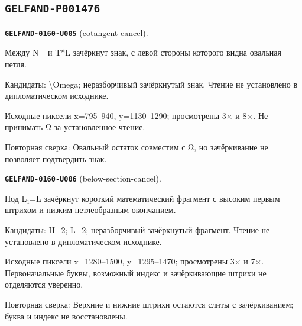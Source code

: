 \subsection*{\texttt{GELFAND-P001476}}
\par\noindent\leavevmode{}\label{GELFAND-0160-U005}\label{GELFAND-P001476:cotangent-cancel}\textbf{\texttt{GELFAND-0160-U005}} (cotangent-cancel).\nopagebreak[4]\par
Между N= и T*L зачёркнут знак, с левой стороны которого видна овальная петля.\par
Кандидаты: \textbackslash{}Omega; неразборчивый зачёркнутый знак. Чтение не установлено в дипломатическом исходнике.\par
Исходные пиксели x=795–940, y=1130–1290; просмотрены 3× и 8×. Не принимать Ω за установленное чтение.\par
Повторная сверка: Овальный остаток совместим с Ω, но зачёркивание не позволяет подтвердить знак.\par\medskip
\par\noindent\leavevmode{}\label{GELFAND-0160-U006}\label{GELFAND-P001476:below-section-cancel}\textbf{\texttt{GELFAND-0160-U006}} (below-section-cancel).\nopagebreak[4]\par
Под L₁=L зачёркнут короткий математический фрагмент с высоким первым штрихом и низким петлеобразным окончанием.\par
Кандидаты: H\_2; L\_2; неразборчивый зачёркнутый фрагмент. Чтение не установлено в дипломатическом исходнике.\par
Исходные пиксели x=1280–1500, y=1295–1470; просмотрены 3× и 7×. Первоначальные буквы, возможный индекс и зачёркивающие штрихи не отделяются уверенно.\par
Повторная сверка: Верхние и нижние штрихи остаются слиты с зачёркиванием; буква и индекс не восстановлены.\par\medskip
